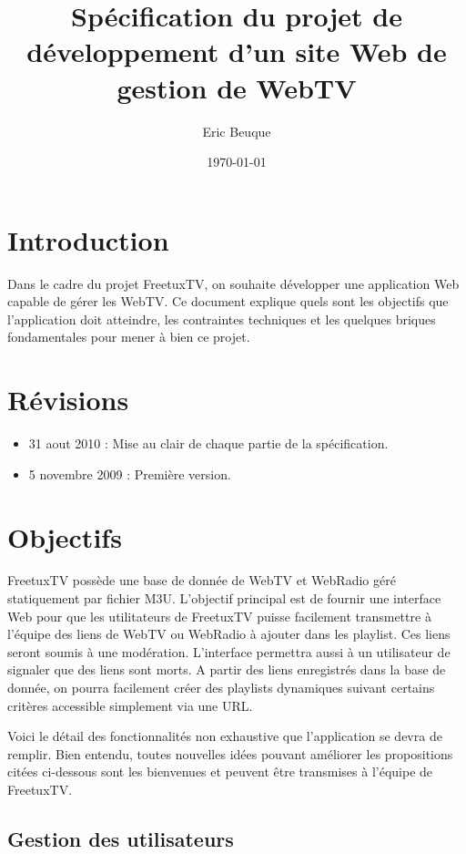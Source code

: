 \documentclass[10pt,a4paper]{article}
\author{Eric Beuque}
\title{Spécification du projet de développement d'un site Web de gestion de WebTV}
\date{\today}
\begin{document}
\maketitle

\section*{Introduction}

Dans le cadre du projet FreetuxTV, on souhaite développer une application Web capable de gérer les WebTV. Ce document explique quels sont les objectifs que l'application doit atteindre, les contraintes techniques et les quelques briques fondamentales pour mener à bien ce projet.

\section*{Révisions}

\begin{itemize}
\item 31 aout 2010 : Mise au clair de chaque partie de la spécification.
\item 5 novembre 2009 : Première version.
\end{itemize}

\section{Objectifs}

FreetuxTV possède une base de donnée de WebTV et WebRadio géré statiquement par fichier M3U. L'objectif principal est de fournir une interface Web pour que les utilitateurs de FreetuxTV puisse facilement transmettre à l'équipe des liens de WebTV ou WebRadio à ajouter dans les playlist. Ces liens seront soumis à une modération. L'interface permettra aussi à un utilisateur de signaler que des liens sont morts. A partir des liens enregistrés dans la base de donnée, on pourra facilement créer des playlists dynamiques suivant certains critères accessible simplement via une URL.

Voici le détail des fonctionnalités non exhaustive que l'application se devra de remplir. Bien entendu, toutes nouvelles idées pouvant améliorer les propositions citées ci-dessous sont les bienvenues et peuvent être transmises à l'équipe de FreetuxTV.

\subsection{Gestion des utilisateurs}
\end{document}
